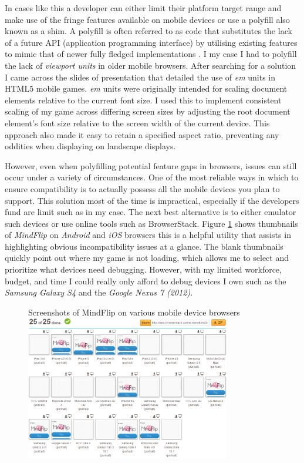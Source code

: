 \documentclass[final]{cmpreport}
\begin{document}
In cases like this a developer can either limit their platform target range and make use of the fringe features available on mobile devices or use a polyfill also known as a shim. A polyfill is often referred to as code that substitutes the lack of a future API (application programming interface) by utilising existing features to mimic that of newer fully fledged implementations \cite{Lawson}. I my case I had to polyfill the lack of \textit{viewport units} in older mobile browsers. After searching for a solution I came across the slides of \cite{Kadrmas} presentation that detailed the use of \textit{em} units in HTML5 mobile games. \textit{em} units were originally intended for scaling document elements relative to the current font size. I used this to implement consistent scaling of my game across differing screen sizes by adjusting the root document element's font size relative to the screen width of the current device. This approach also made it easy to retain a specified aspect ratio, preventing any oddities when displaying on landscape displays.


However, even when polyfilling potential feature gaps in browsers, issues can still occur under a variety of circumstances. One of the most reliable ways in which to ensure compatibility is to actually possess all the mobile devices you plan to support. This solution most of the time is impractical, especially if the developers fund are limit such as in my case. The next best alternative is to either emulator such devices or use online tools such as BrowserStack\footnotemark[4]. Figure \ref{browserstack} shows thumbnails of \textit{MindFlip} on \textit{Android} and \textit{iOS} browsers this is a helpful utility that assists in highlighting obvious incompatibility issues at a glance. The blank thumbnails quickly point out where my game is not loading, which allows me to select and prioritize what devices need debugging. However, with my limited workforce, budget, and time I could really only afford to debug devices I own such as the \textit{Samsung Galaxy S4} and the \textit{Google Nexus 7 (2012)}.


\begin{figure}[h]{Screenshots of MindFlip on various mobile device browsers \label{browserstack}}
  \centering
    \includegraphics[width=0.8\textwidth]{browserstack.png}
\end{figure}
\end{document}
